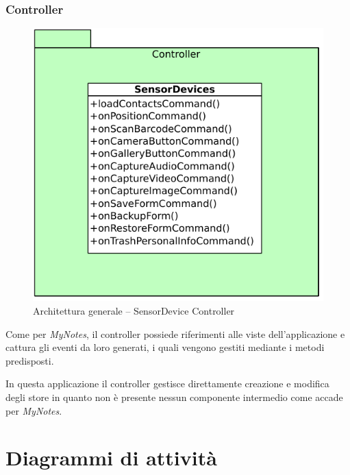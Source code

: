 \subsubsection{Controller}
\begin{figure}[htb]
\centering
\includegraphics[scale=0.6]{gfx/class/SensorDevice_Controller.pdf}
\caption{Architettura generale -- SensorDevice Controller}
\label{fig:architettura SensorDevice Controller}
\end{figure}
Come per \emph{MyNotes}, il controller possiede riferimenti alle viste dell'applicazione e cattura gli eventi da loro generati, i quali vengono gestiti mediante i metodi predisposti.

In questa applicazione il controller gestisce direttamente creazione e modifica degli store in quanto non è presente nessun componente intermedio come accade per \emph{MyNotes}.

\section{Diagrammi di attività}